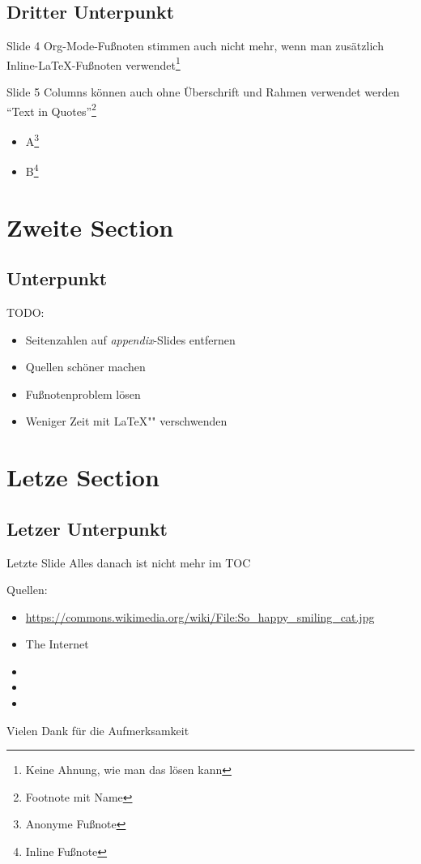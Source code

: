 \documentclass[t,compress,11pt,xcolor=dvipsnames]{beamer}
\begin{document}
\subsection{Dritter Unterpunkt}
\label{sec-1-3}
\begin{frame}[label=sec-1-3-1]{Slide 4}
Org-Mode-Fußnoten stimmen auch nicht mehr,
wenn man zusätzlich Inline-\LaTeX{}-Fußnoten verwendet\footnote{Keine Ahnung, wie man das lösen kann}
\end{frame}
\begin{frame}[label=sec-1-3-2]{Slide 5}
Columns können auch ohne Überschrift und Rahmen verwendet werden\\
     "`Text in Quotes"'\footnote{Footnote mit Name}
\begin{itemize}
\item A\footnote{Anonyme Fußnote}
\item B\footnote{Inline Fußnote}
\end{itemize}
\end{frame}
\section{Zweite Section}
\label{sec-2}
\subsection{Unterpunkt}
\label{sec-2-1}
\begin{frame}[label=sec-2-1-1]{TODO:}
\begin{itemize}
\item Seitenzahlen auf \emph{appendix}-Slides entfernen
\item Quellen schöner machen
\item Fußnotenproblem lösen
\item Weniger Zeit mit \LaTeX"" verschwenden
\end{itemize}
\end{frame}
\section{Letze Section}
\label{sec-3}
\subsection{Letzer Unterpunkt}
\label{sec-3-1}
\begin{frame}[label=sec-3-1-1]{Letzte Slide}
Alles danach ist nicht mehr im TOC
\end{frame}
\appendix
Quellen:
\tiny\begin{itemize}
\item \url{https://commons.wikimedia.org/wiki/File:So_happy_smiling_cat.jpg}
\item The Internet
\item
\item
\item
\end{itemize}
\small\centering Vielen Dank für die Aufmerksamkeit
\end{document}
